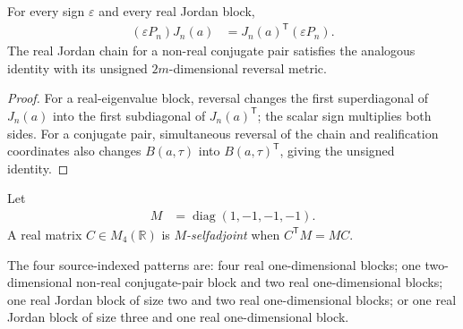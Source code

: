 \begin{theorem}
    \label{thm:canonical_blocks_metric_selfadjoint}
    \leanok
    For every sign $\varepsilon$ and every real Jordan block,
    \begin{align}
        (\varepsilon P_n)J_n(a)
        &=J_n(a)^{\mathsf T}(\varepsilon P_n).
    \end{align}
    The real Jordan chain for a non-real conjugate pair satisfies the
    analogous identity with its unsigned $2m$-dimensional reversal metric.
\end{theorem}

\begin{proof}\leanok
    For a real-eigenvalue block, reversal changes the first superdiagonal
    of $J_n(a)$ into the first subdiagonal of $J_n(a)^{\mathsf T}$; the
    scalar sign multiplies both sides.  For a conjugate pair, simultaneous
    reversal of the chain and realification coordinates also changes
    $B(a,\tau)$ into $B(a,\tau)^{\mathsf T}$, giving the unsigned identity.
\end{proof}

\begin{definition}
    \label{def:four_dimensional_minkowski_selfadjoint}
    \leanok
    Let
    \begin{align}
        M&=\operatorname{diag}(1,-1,-1,-1).
    \end{align}
    A real matrix $C\in M_4(\mathbb R)$ is \emph{$M$-selfadjoint} when
    $C^{\mathsf T}M=MC$.
\end{definition}

\begin{definition}\label{def:vddm_four_block_patterns}
    \leanok
    The four source-indexed patterns are: four real one-dimensional
    blocks; one two-dimensional non-real conjugate-pair block and two real
    one-dimensional blocks; one real Jordan block of size two and two real
    one-dimensional blocks; or one real Jordan block of size three and one
    real one-dimensional block.
\end{definition}

